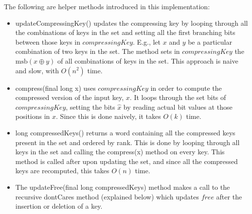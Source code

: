 The following are helper methods introduced in this implementation:
\begin{itemize}
    \item
    {\ttfamily updateCompressingKey()} updates the compressing key by looping through all the combinations of keys in the set and setting all the first branching bits between those keys in $compressingKey$. E.g., let $x$ and $y$ be a particular combination of two keys in the set. The method sets in $compressingKey$ the $\text{msb}(x \oplus y)$ of all combinations of keys in the set. This approach is naive and slow, with $O(n^2)$ time.
    
    \item
    {\ttfamily compress(final long x)} uses $compressingKey$ in order to compute the compressed version of the input key, $x$. It loops through the set bits of $compressingKey$, setting the bits $\hat x$ by reading actual bit values at those positions in $x$. Since this is done naively, it takes $O(k)$ time.

    \item
    {\ttfamily long compressedKeys()} returns a word containing all the compressed keys present in the set and ordered by rank. This is done by looping through all keys in the set and calling the {\ttfamily compress(x)} method on every key. This method is called after upon updating the set, and since all the compressed keys are recomputed, this takes $O(n)$ time.
    
    \item
    The {\ttfamily updateFree(final long compressedKeys)} method makes a call to the recursive {\ttfamily dontCares} method (explained below) which updates $free$ after the insertion or deletion of a key.


\end{itemize}
